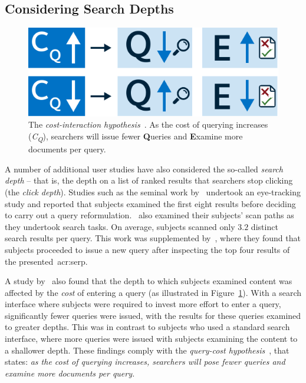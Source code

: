 \subsection{Considering Search Depths}\label{sec:stopping_background:user_studies:depths}
\begin{figure}
    \begin{center}
    \vspace*{-8mm}
    \includegraphics[width=1\textwidth]{figures/ch3-query-cost.pdf}
    \end{center}
    \vspace*{-4mm}
    \caption[The cost-interaction hypothesis]{The \emph{cost-interaction hypothesis}~\citep{azzopardi2011economics}. As the cost of querying increases (\emph{C\textsubscript{Q}}), searchers will issue fewer \textbf{Q}ueries and \textbf{E}xamine more documents per query.}
    \label{fig:query_cost}
\end{figure}

A number of additional user studies have also considered the so-called \emph{search depth} -- that is, the depth on a list of ranked results that searchers stop clicking (the \emph{click depth}). Studies such as the seminal work by~\cite{cutrell2007eye_tracking} undertook an eye-tracking study and reported that subjects examined the first eight results before deciding to carry out a query reformulation.~\cite{lorigo2008eye_tracking} also examined their subjects' scan paths as they undertook search tasks. On average, subjects scanned only $3.2$ distinct search results per query. This work was supplemented by~\cite{huang2011no_clicks}, where they found that subjects proceeded to issue a new query after inspecting the top four results of the presented~\gls{acr:serp}.

A study by~\cite{azzopardi2013query_cost} also found that the depth to which subjects examined content was affected by the \emph{cost} of entering a query (as illustrated in Figure~\ref{fig:query_cost}). With a search interface where subjects were required to invest more effort to enter a query, significantly fewer queries were issued, with the results for these queries examined to greater depths. This was in contrast to subjects who used a standard search interface, where more queries were issued with subjects examining the content to a shallower depth. These findings comply with the \emph{query-cost hypothesis}~\citep{azzopardi2011economics}, that states: \emph{as the cost of querying increases, searchers will pose fewer queries and examine more documents per query.}

